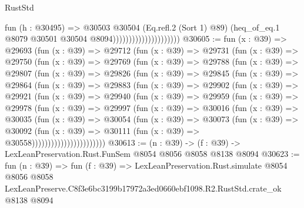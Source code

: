 \begin{lexlean}{RustStd}
\begin{coremodule}
                                          fun (h : @30495) =>
                                          @30503
                                            @30504
                                            (Eq.refl.{2} (Sort 1) @89)
                                            (heq_of_eq.{1}
                                              @8079
                                              @30501
                                              @30504
                                              @8094)))))))))))))))))))))
@30605 := fun (x : @39) =>
  @29693
    (fun (x : @39) =>
    @29712
      (fun (x : @39) =>
      @29731
        (fun (x : @39) =>
        @29750
          (fun (x : @39) =>
          @29769
            (fun (x : @39) =>
            @29788
              (fun (x : @39) =>
              @29807
                (fun (x : @39) =>
                @29826
                  (fun (x : @39) =>
                  @29845
                    (fun (x : @39) =>
                    @29864
                      (fun (x : @39) =>
                      @29883
                        (fun (x : @39) =>
                        @29902
                          (fun (x : @39) =>
                          @29921
                            (fun (x : @39) =>
                            @29940
                              (fun (x : @39) =>
                              @29959
                                (fun (x : @39) =>
                                @29978
                                  (fun (x : @39) =>
                                  @29997
                                    (fun (x : @39) =>
                                    @30016
                                      (fun (x : @39) =>
                                      @30035
                                        (fun (x : @39) =>
                                        @30054
                                          (fun (x : @39) =>
                                          @30073
                                            (fun (x : @39) =>
                                            @30092
                                              (fun (x : @39) =>
                                              @30111 (fun (x : @39) => @30558)))))))))))))))))))))))
@30613 := (n : @39) -> (f : @39) -> LexLeanPreservation.Rust.FunSem @8054 @8056 @8058 @8138 @8094
@30623 := fun (n : @39) =>
  fun (f : @39) =>
  LexLeanPreservation.Rust.simulate
    @8054
    @8056
    @8058
    LexLeanPreserve.C8f3e6bc3199b17972a3ed0660ebf1098.R2.RustStd.crate_ok
    @8138
    @8094
\end{coremodule}
\end{lexlean}
